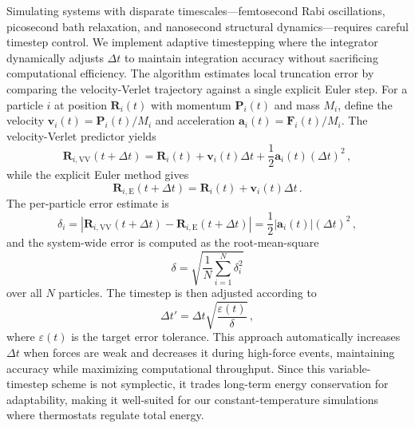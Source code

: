 \documentclass[%
 reprint,
 amsmath,amssymb,
 aps,
]{revtex4-2}
\begin{document}
Simulating systems with disparate timescales---femtosecond Rabi oscillations, picosecond bath relaxation, and nanosecond structural dynamics---requires careful timestep control.
We implement adaptive timestepping where the integrator dynamically adjusts $\Delta t$ to maintain integration accuracy without sacrificing computational efficiency.
The algorithm estimates local truncation error by comparing the velocity-Verlet trajectory against a single explicit Euler step.
For a particle $i$ at position $\bm{R}_i(t)$ with momentum $\bm{P}_i(t)$ and mass $M_i$, define the velocity $\bm{v}_i(t) = \bm{P}_i(t)/M_i$ and acceleration $\bm{a}_i(t) = \bm{F}_i(t)/M_i$.
The velocity-Verlet predictor yields
\begin{equation}
\bm{R}_{i,\mathrm{VV}}(t + \Delta t) = \bm{R}_i(t) + \bm{v}_i(t) \Delta t + \frac{1}{2} \bm{a}_i(t) (\Delta t)^2 \,,
\end{equation}
while the explicit Euler method gives
\begin{equation}
\bm{R}_{i,\mathrm{E}}(t + \Delta t) = \bm{R}_i(t) + \bm{v}_i(t) \Delta t \,.
\end{equation}
The per-particle error estimate is
\begin{equation}
\delta_i = \left| \bm{R}_{i,\mathrm{VV}}(t + \Delta t) - \bm{R}_{i,\mathrm{E}}(t + \Delta t) \right| = \frac{1}{2} \left|\bm{a}_i(t)\right| (\Delta t)^2 \,,
\end{equation}
and the system-wide error is computed as the root-mean-square
\begin{equation}
\delta = \sqrt{\frac{1}{N} \sum_{i=1}^{N} \delta_i^2}
\end{equation}
over all $N$ particles.
The timestep is then adjusted according to
\begin{equation}
\Delta t' = \Delta t \sqrt{\frac{\varepsilon(t)}{\delta}} \,,
\end{equation}
where $\varepsilon(t)$ is the target error tolerance.
This approach automatically increases $\Delta t$ when forces are weak and decreases it during high-force events, maintaining accuracy while maximizing computational throughput.
Since this variable-timestep scheme is not symplectic, it trades long-term energy conservation for adaptability, making it well-suited for our constant-temperature simulations where thermostats regulate total energy.
\end{document}
